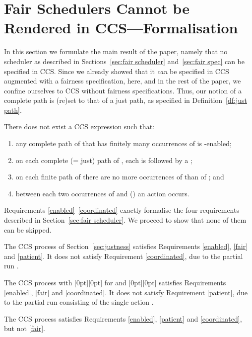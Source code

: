 \documentclass[smallcondensed]{svjour3}
\newcommand{\plat}[1]{\raisebox{0pt}[0pt][0pt]{#1}}  \def\precond#1{{\vphantom{#1}}^\bullet #1}
\newcommand{\Def}[1]{Definition~\ref{df:#1}}
\newcommand{\Sect}[1]{Section~\ref{sec:#1}}
\newcounter {part}
\begin{document}
\section[Fair Schedulers Cannot be Rendered in CCS---Formalisation]
        {Fair Schedulers Cannot be Rendered in CCS---Formalisation}\label{sec:no fair scheduler}


In this section we formulate the main result of the paper, namely that no scheduler as described in
Sections~\ref{sec:fair scheduler} and~\ref{sec:fair spec} can be specified in CCS. Since we already showed that it \emph{can} be
specified in CCS augmented with a fairness specification, here, and in the rest of the paper, we
confine ourselves to CCS without fairness specifications. Thus, our notion of a
complete path is (re)set to that of a just path, as specified in \Def{just path}.

\begin{theorem}\rm\label{thm:no fair scheduler}
There does not exist a CCS expression  such that:
\vspace{-1ex}
\begin{enumerate}
\item any complete path of  that has finitely many occurrences of  is -enabled;\label{enabled}
\item on each complete (= just) path of , each  is followed by a ;\label{fair}
\item on each finite path of  there are no more occurrences of  than of ;\label{patient} and
\item between each two occurrences of  and  () an action  occurs.\label{coordinated}
\end{enumerate}
\end{theorem}
Requirements \ref{enabled}--\ref{coordinated} exactly formalise the
four requirements described in \Sect{fair scheduler}. We proceed to show that none of them can be skipped.

The CCS process  of \Sect{justness}
satisfies Requirements \ref{enabled}, \ref{fair} and \ref{patient}.
It does not satisfy Requirement \ref{coordinated}, due to the partial run .
\vspace{2pt}

The CCS process  with \plat{} for  and
\plat{}
satisfies Requirements \ref{enabled}, \ref{fair} and \ref{coordinated}.
It does not satisfy Requirement \ref{patient}, due to the partial run consisting of the single action .

The CCS process  satisfies
Requirements \ref{enabled}, \ref{patient} and \ref{coordinated}, but not \ref{fair}.
\vspace{2pt}
\end{document}
